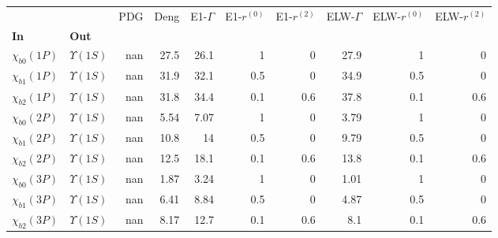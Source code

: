 \begin{tabular}{l|l|r|r|r|r|r|r|r|r}
\toprule
                &                &  PDG &  Deng &  E1-$\Gamma$ &  E1-$r^{(0)}$ &  E1-$r^{(2)}$ &  ELW-$\Gamma$ &  ELW-$r^{(0)}$ &  ELW-$r^{(2)}$ \\
\textbf{In} & \textbf{Out} &      &       &              &               &               &               &                &                \\
\midrule
\textbf{$\chi_{b0}(1P)$} & \textbf{$\Upsilon(1S)$} &  nan &  27.5 &         26.1 &             1 &             0 &          27.9 &              1 &              0 \\
\textbf{$\chi_{b1}(1P)$} & \textbf{$\Upsilon(1S)$} &  nan &  31.9 &         32.1 &           0.5 &             0 &          34.9 &            0.5 &              0 \\
\textbf{$\chi_{b2}(1P)$} & \textbf{$\Upsilon(1S)$} &  nan &  31.8 &         34.4 &           0.1 &           0.6 &          37.8 &            0.1 &            0.6 \\
\textbf{$\chi_{b0}(2P)$} & \textbf{$\Upsilon(1S)$} &  nan &  5.54 &         7.07 &             1 &             0 &          3.79 &              1 &              0 \\
\textbf{$\chi_{b1}(2P)$} & \textbf{$\Upsilon(1S)$} &  nan &  10.8 &           14 &           0.5 &             0 &          9.79 &            0.5 &              0 \\
\textbf{$\chi_{b2}(2P)$} & \textbf{$\Upsilon(1S)$} &  nan &  12.5 &         18.1 &           0.1 &           0.6 &          13.8 &            0.1 &            0.6 \\
\textbf{$\chi_{b0}(3P)$} & \textbf{$\Upsilon(1S)$} &  nan &  1.87 &         3.24 &             1 &             0 &          1.01 &              1 &              0 \\
\textbf{$\chi_{b1}(3P)$} & \textbf{$\Upsilon(1S)$} &  nan &  6.41 &         8.84 &           0.5 &             0 &          4.87 &            0.5 &              0 \\
\textbf{$\chi_{b2}(3P)$} & \textbf{$\Upsilon(1S)$} &  nan &  8.17 &         12.7 &           0.1 &           0.6 &           8.1 &            0.1 &            0.6 \\
\bottomrule
\end{tabular}
